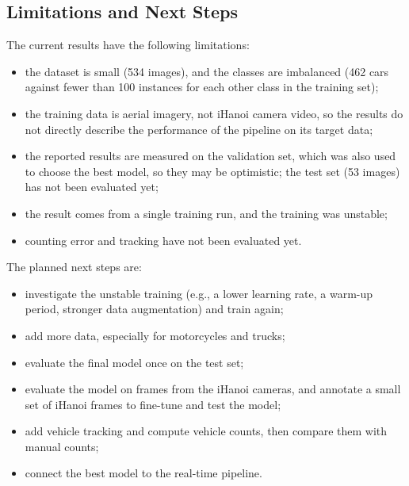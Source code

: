 \documentclass[12pt,a4paper]{article}
\begin{document}
\subsection{Limitations and Next Steps}
\label{subsec:ml-next}
The current results have the following limitations:
\begin{itemize}
  \item the dataset is small (534 images), and the classes are imbalanced
        (462 cars against fewer than 100 instances for each other class in
        the training set);
  \item the training data is aerial imagery, not iHanoi camera video, so the
        results do not directly describe the performance of the pipeline on
        its target data;
  \item the reported results are measured on the validation set, which was also
        used to choose the best model, so they may be optimistic; the test set
        (53 images) has not been evaluated yet;
  \item the result comes from a single training run, and the training was
        unstable;
  \item counting error and tracking have not been evaluated yet.
\end{itemize}
The planned next steps are:
\begin{itemize}
  \item investigate the unstable training (e.g., a lower learning rate, a
        warm-up period, stronger data augmentation) and train again;
  \item add more data, especially for motorcycles and trucks;
  \item evaluate the final model once on the test set;
  \item evaluate the model on frames from the iHanoi cameras, and annotate a
        small set of iHanoi frames to fine-tune and test the model;
  \item add vehicle tracking and compute vehicle counts, then compare them with
        manual counts;
  \item connect the best model to the real-time pipeline.
\end{itemize}

\end{document}
